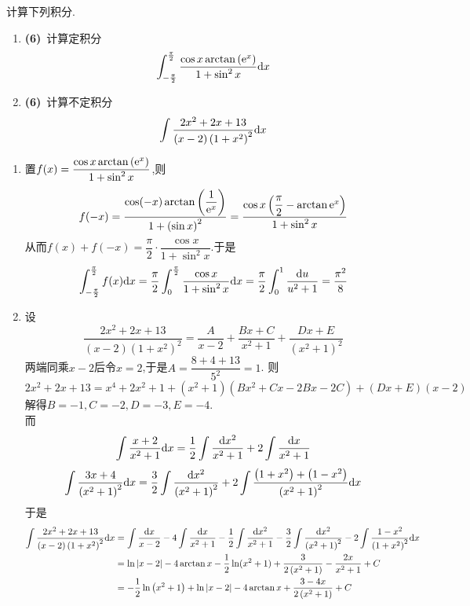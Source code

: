 \documentclass{ctexart}
\begin{document}
\begin{problem}[3.(12\songti{分})]
    计算下列积分.
    \begin{enumerate}[label=\textbf{(\arabic*)}]
        \item \textbf{(6)}\ 计算定积分$$\int_{-\frac{\pi}{2}}^{\frac{\pi}{2}}\dfrac{\cos x\arctan\left(\mathrm{e}^x\right)}{1+\sin^2x}\mathrm{d} x$$
        \item \textbf{(6)}\ 计算不定积分$$\int\dfrac{2x^2+2x+13}{(x-2)\left(1+x^2\right)^2}\mathrm{d} x$$
    \end{enumerate}
\end{problem}
\begin{solution}
    \begin{enumerate}[label=\textbf{(\arabic*)}]
        \item 置$f(x)=\dfrac{\cos x\arctan\left(\mathrm{e}^x\right)}{1+\sin^2x}$,则
            $$f(-x)=\dfrac{\cos(-x)\arctan\left(\dfrac{1}{\mathrm{e}^x}\right)}{1+\left(\sin x\right)^2}=\dfrac{\cos x\left(\dfrac{\pi}{2}-\arctan\mathrm{e}^x\right)}{1+\sin^2x}$$
            从而$f(x)+f(-x)=\dfrac{\pi}{2}\cdot\dfrac{\cos x}{1+\sin^2x}$.于是
            $$\int_{-\frac{\pi}{2}}^{\frac{\pi}{2}}f(x)\mathrm{d} x=\dfrac{\pi}{2}\int_{0}^{\frac{\pi}{2}}\dfrac{\cos x}{1+\sin^2x}\mathrm{d} x=\dfrac{\pi}{2}\int_0^1\dfrac{\mathrm{d} u}{u^2+1}=\dfrac{\pi^2}{8}$$
        \item 设$$\dfrac{2x^2+2x+13}{(x-2)\left(1+x^2\right)^2}=\dfrac{A}{x-2}+\dfrac{Bx+C}{x^2+1}+\dfrac{Dx+E}{\left(x^2+1\right)^2}$$
            两端同乘$x-2$后令$x=2$,于是$A=\dfrac{8+4+13}{5^2}=1$.
            则$$2x^2+2x+13=x^4+2x^2+1+\left(x^2+1\right)\left(Bx^2+Cx-2Bx-2C\right)+(Dx+E)(x-2)$$
            解得$B=-1,C=-2,D=-3,E=-4$.\\
            而$$\int\dfrac{x+2}{x^2+1}\mathrm{d} x=\dfrac{1}{2}\int\dfrac{\mathrm{d} x^2}{x^2+1}+2\int\dfrac{\mathrm{d} x}{x^2+1}$$
            $$\int\dfrac{3x+4}{\left(x^2+1\right)^2}\mathrm{d} x=\dfrac{3}{2}\int\dfrac{\mathrm{d} x^2}{\left(x^2+1\right)^2}+2\int\dfrac{\left(1+x^2\right)+\left(1-x^2\right)}{\left(x^2+1\right)^2}\mathrm{d} x$$
            于是$$\begin{aligned}
                \int\dfrac{2x^2+2x+13}{(x-2)\left(1+x^2\right)^2}\mathrm{d} x
                &= \int\dfrac{\mathrm{d} x}{x-2}-4\int\dfrac{\mathrm{d} x}{x^2+1}-\dfrac{1}{2}\int\dfrac{\mathrm{d} x^2}{x^2+1}-\dfrac{3}{2}\int\dfrac{\mathrm{d} x^2}{\left(x^2+1\right)^2}-2\int\dfrac{1-x^2}{\left(1+x^2\right)^2}\mathrm{d} x \\
                &= \ln\left|x-2\right|-4\arctan x-\dfrac{1}{2}\ln(x^2+1)+\dfrac{3}{2\left(x^2+1\right)}-\dfrac{2x}{x^2+1}+C\\
                &= -\dfrac{1}{2}\ln\left(x^2+1\right)+\ln\left|x-2\right|-4\arctan x+\dfrac{3-4x}{2\left(x^2+1\right)}+C
            \end{aligned}$$
    \end{enumerate}
\end{solution}
\end{document}

